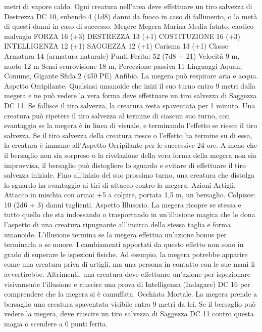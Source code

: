 \begin{multicols}{2}
metri di vapore caldo. Ogni creatura nell’area deve effettuare un
tiro salvezza di Destrezza DC 10, subendo 4 (1d8) danni da
fuoco in caso di fallimento, o la metà di questi danni in caso di
successo.
Megere
Megera Marina
Media fatato, caotico malvagio
FORZA 16 (+3)
DESTREZZA 13 (+1)
COSTITUZIONE 16 (+3)
INTELLIGENZA 12 (+1)
SAGGEZZA 12 (+1)
Carisma 13 (+1)
Classe Armatura 14 (armatura naturale)
\hspace*{0pt}\hfill{Punti Ferita}: 52 (7d8 + 21)
Velocità 9 m, nuoto 12 m
Sensi scurovisione 18 m, Percezione passiva 11
Linguaggi Aquan, Comune, Gigante
Sfida 2 (450 PE)
Anfibio. La megera può respirare aria e acqua.
Aspetto Orripilante. Qualsiasi umanoide che inizi il suo turno
entro 9 metri dalla megera e ne può vedere la vera forma deve
effettuare un tiro salvezza di Saggezza DC 11. Se fallisce il tiro
salvezza, la creatura resta spaventata per 1 minuto. Una creatura
può ripetere il tiro salvezza al termine di ciascun suo turno, con
svantaggio se la megera è in linea di visuale, e terminando
l’effetto se riesce il tiro salvezza. Se il tiro salvezza della creatura
riesce o l’effetto ha termine su di essa, la creatura è immune
all’Aspetto Orripilante per le successive 24 ore.
A meno che il bersaglio non sia sorpreso o la rivelazione della
vera forma della megera non sia improvvisa, il bersaglio può
distogliere lo sguardo e evitare di effettuare il tiro salvezza
iniziale. Fino all’inizio del suo prossimo turno, una creatura che
distolga lo sguardo ha svantaggio ai tiri di attacco contro la
megera.
Azioni
Artigli. Attacco in mischia con arma: +5 a colpire, portata 1,5 m,
un bersaglio.
Colpisce: 10 (2d6 + 3) danni taglienti.
Aspetto Illusorio. La megera ricopre se stessa e tutto quello che
sta indossando o trasportando in un’illusione magica che le dona
l’aspetto di una creatura ripugnante all’incirca della stessa taglia
e forma umanoide. L’illusione termina se la megera effettua
un’azione bonus per terminarla o se muore.
I cambiamenti apportati da questo effetto non sono in grado di
superare le ispezioni fisiche. Ad esempio, la megera potrebbe
apparire come una creatura priva di artigli, ma una persona in
contatto con le sue mani li avvertirebbe. Altrimenti, una creatura
deve effettuare un’azione per ispezionare visivamente l’illusione
e riuscire una prova di Intelligenza (Indagare) DC 16 per
comprendere che la megera si è camuffata.
Occhiata Mortale. La megera prende a bersaglio una creatura
spaventata visibile entro 9 metri da lei. Se il bersaglio può vedere
la megera, deve riuscire un tiro salvezza di Saggezza DC 11
contro questa magia o scendere a 0 punti ferita.

\end{multicols}
